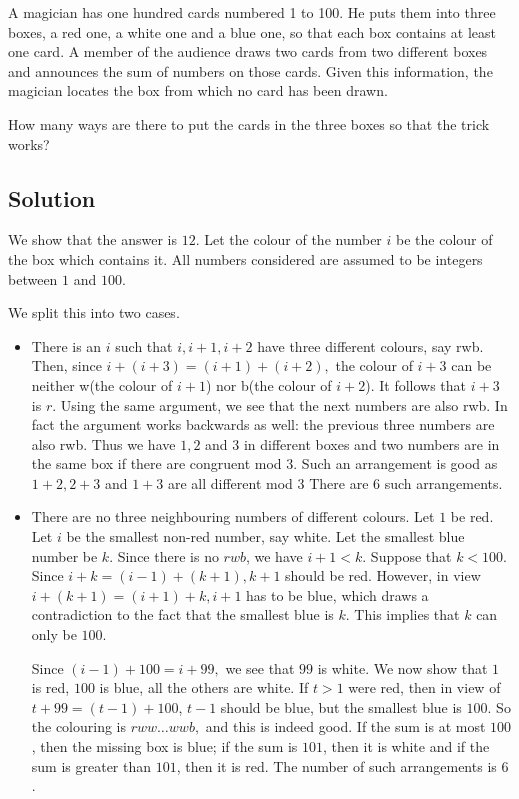 \documentclass[mast]{lucky}
\begin{document}
A magician has one hundred cards numbered 1 to 100. He puts them into three boxes, a red one, a white one and a blue one, so that each box contains at least one card. A member of the audience draws two cards from two different boxes and announces the sum of numbers on those cards. Given this information, the magician locates the box from which no card has been drawn.

How many ways are there to put the cards in the three boxes so that the trick works?

\subsection{Solution}

We show that the answer is $12$. Let the colour of the number $i$ be the colour of the box which contains it. All numbers considered are assumed to be integers between $1$ and $100$.

We split this into two cases.

\begin{itemize}
    \item There is an $i$ such that $i, i + 1, i + 2$ have three different colours, say rwb. Then, since $i + (i + 3) = (i + 1) + (i + 2),$ the colour of $i + 3$ can be neither w(the colour of $i + 1$) nor b(the colour of $i + 2$). It follows that $i + 3$ is $r$. Using the same argument, we see that the next numbers are also rwb. In fact the argument works backwards as well: the previous three numbers are also rwb. Thus we have $1, 2$ and $3$ in different boxes and two numbers are in the same box if there are congruent mod $3$. Such an arrangement is good as $1 + 2, 2 + 3$ and $1 + 3 $ are all different mod $3$ There are $6$ such arrangements.

    \item There are no three neighbouring numbers of different colours. Let $1$ be red. Let $i$ be the smallest non-red number, say white. Let the smallest blue number be $k$. Since there is no $rwb$, we have $i + 1 < k.$ Suppose that $k < 100$. Since $i + k = (i - 1) + (k + 1), k + 1$ should be red. However, in view  $i + (k + 1) = (i + 1) + k, i + 1$ has to be blue, which draws a contradiction to the fact that the smallest blue is $ k$. This implies that $k$ can only be $100$.

Since $(i - 1) + 100 = i + 99,$ we see that $99$ is white. We now show that $1$ is red, $100$ is blue, all the others are white. If $t > 1$ were red, then in view of $t + 99 = (t - 1) + 100$, $t - 1$ should be blue, but the smallest blue is $100.$ So the colouring is $rww\ldots wwb,$ and this is indeed good. If the sum is at most $100$, then the missing box is blue; if the sum is $101$, then it is white and if the sum is greater than $101$, then it is red. The number of such arrangements is $6$.
\end{itemize}
 
\end{document}
